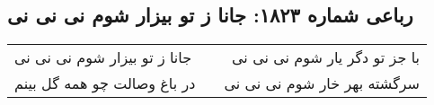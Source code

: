 \begin{center}
\section*{رباعی شماره ۱۸۲۳: جانا ز تو بیزار شوم نی نی نی}
\label{sec:1823}
\begin{longtable}{l p{0.5cm} r}
جانا ز تو بیزار شوم نی نی نی
&&
با جز تو دگر یار شوم نی نی نی
\\
در باغ وصالت چو همه گل بینم
&&
سرگشته بهر خار شوم نی نی نی
\\
\end{longtable}
\end{center}
